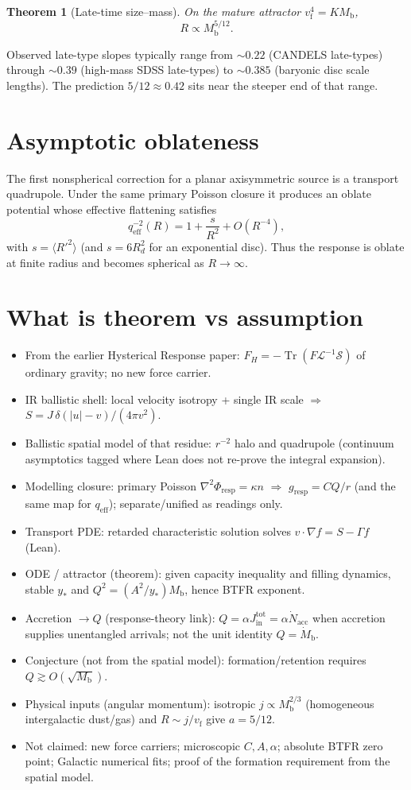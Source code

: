\documentclass[11pt]{article}
\newtheorem{theorem}{Theorem}[section]
\theoremstyle{definition}
\theoremstyle{remark}
\newcommand{\Mb}{M_{\mathrm{b}}}
\newcommand{\vf}{v_{\mathrm{f}}}
\newcommand{\qeff}{q_{\mathrm{eff}}}
\newcommand{\FH}{F_H}
\newcommand{\Tr}{\operatorname{Tr}}
\begin{document}
\begin{theorem}[Late-time size--mass]
On the mature attractor $\vf^{4}=K\Mb$,
\[
  R\propto\Mb^{5/12}.
\]
\end{theorem}

Observed late-type slopes typically range from $\sim0.22$ (CANDELS late-types) through $\sim0.39$ (high-mass SDSS late-types) to $\sim0.385$ (baryonic disc scale lengths).
The prediction $5/12\approx0.42$ sits near the steeper end of that range.

\section{Asymptotic oblateness}
The first nonspherical correction for a planar axisymmetric source is a transport quadrupole.
Under the same primary Poisson closure it produces an oblate potential whose effective flattening satisfies
\[
  \qeff^{-2}(R)=1+\frac{s}{R^{2}}+O(R^{-4}),
\]
with $s=\langle R'^{2}\rangle$ (and $s=6R_{d}^{2}$ for an exponential disc).
Thus the response is oblate at finite radius and becomes spherical as $R\to\infty$.

\section{What is theorem vs assumption}
\begin{itemize}
\item From the earlier Hysterical Response paper: $\FH=-\Tr(F\mathcal L^{-1}\mathcal S)$ of ordinary gravity; no new force carrier.
\item IR ballistic shell: local velocity isotropy + single IR scale $\Rightarrow$ $S=J\,\delta(|u|-v)/(4\pi v^{2})$.
\item Ballistic spatial model of that residue: $r^{-2}$ halo and quadrupole (continuum asymptotics tagged where Lean does not re-prove the integral expansion).
\item Modelling closure: primary Poisson $\nabla^{2}\Phi_{\mathrm{resp}}=\kappa n$ $\Rightarrow$ $g_{\mathrm{resp}}=CQ/r$ (and the same map for $\qeff$); separate/unified as readings only.
\item Transport PDE: retarded characteristic solution solves $v\cdot\nabla f=S-\Gamma f$ (Lean).
\item ODE / attractor (theorem): given capacity inequality and filling dynamics, stable $y_{\ast}$ and $Q^{2}=(A^{2}/y_{\ast})\Mb$, hence BTFR exponent.
\item Accretion $\to Q$ (response-theory link): $Q=\alpha J_{\mathrm{in}}^{\mathrm{tot}}=\alpha\dot N_{\mathrm{acc}}$ when accretion supplies unentangled arrivals; not the unit identity $Q=\dot\Mb$.
\item Conjecture (not from the spatial model): formation/retention requires $\boxed{Q\gtrsim O(\sqrt{\Mb})}$.
\item Physical inputs (angular momentum): isotropic $j\propto\Mb^{2/3}$ (homogeneous intergalactic dust/gas) and $R\sim j/\vf$ give $a=5/12$.
\item Not claimed: new force carriers; microscopic $C,A,\alpha$; absolute BTFR zero point; Galactic numerical fits; proof of the formation requirement from the spatial model.
\end{itemize}
\end{document}
